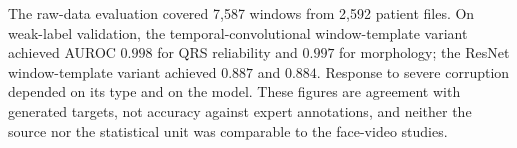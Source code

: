 \documentclass[10pt,a4paper]{article}
\begin{document}
\begin{center}
\begin{minipage}{\linewidth}
\centering

\label{fig:ecgarch}
\end{minipage}
\end{center}

The raw-data evaluation covered 7,587 windows from 2,592 patient files. On weak-label validation, the temporal-convolutional window-template variant achieved AUROC $0.998$ for QRS reliability and $0.997$ for morphology; the ResNet window-template variant achieved $0.887$ and $0.884$. Response to severe corruption depended on its type and on the model. These figures are agreement with generated targets, not accuracy against expert annotations, and neither the source nor the statistical unit was comparable to the face-video studies.
\end{document}
